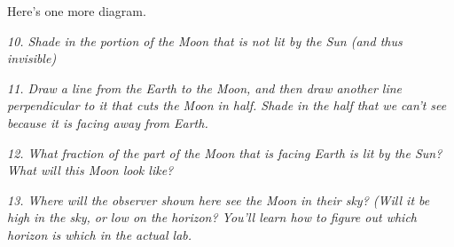 \documentclass[11pt]{article}
\begin{document}
Here's one more diagram. 

{\it 10. Shade in the portion of the Moon that is not lit by the Sun (and thus invisible)}

{\it 11. Draw a line from the Earth to the Moon, and then draw another line perpendicular to it that cuts the Moon in half. Shade in the half that we can't see because it is facing away from Earth.}

{\it 12. What fraction of the part of the Moon that is facing Earth is lit by the Sun? What will this Moon look like?}

\vspace{1.5in}

{\it 13. Where will the observer shown here see the Moon in their sky? (Will it be high in the sky, or low on the horizon? You'll learn how to figure out which horizon is which in the actual lab.}
\end{document}

